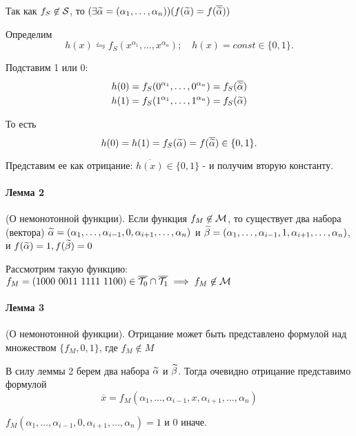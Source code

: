 \begin{myproof}
    Так как $f_S \not\in {\cal S}$, то $(\exists \widetilde{\alpha} = (\alpha_1, \ldots, \alpha_n))
    (f(\widetilde{\alpha}) = f(\overline{\widetilde{\alpha}}))$ 

    Определим
    $$
    h(x) \leftrightharpoons f_S(x^{\alpha_1}, \ldots, x^{\alpha_n});
    \quad
    h(x) = const \in \{0,1\} 
    .$$ 

    Подставим 1 или 0:
    \begin{align*}
        &h(0) = f_S(0^{\alpha_1}, \ldots, 0^{\alpha_n}) = f_S(\overline{\widetilde{\alpha}})\\
        &h(1) = f_S(1^{\alpha_1}, \ldots, 1^{\alpha_n}) = f_S(\widetilde{\alpha})
    \end{align*}

    То есть
    \[
    h(0) = h(1) = f_S(\widetilde{\alpha}) = f(\overline{\widetilde{\alpha}}) \in \{0,1\} 
    .\]

    Представим ее как отрицание: $\overline{h(x)} \in \{0,1\} $ - и получим вторую константу.
\end{myproof}


\paragraph*{Лемма 2} (О немонотонной функции).
Если функция $f_M \not\in {\cal M}$, то существует два набора (вектора)  $\widetilde{\alpha} = (\alpha_1, \ldots,
\alpha_{i-1}, 0, \alpha_{i+1}, \ldots, \alpha_n)$ и $\widetilde{\beta} = (\alpha_1, \ldots,
\alpha_{i-1}, 1, \alpha_{i+1}, \ldots, \alpha_n)$, и $f(\widetilde{\alpha}) = 1, f(\widetilde{\beta}) = 0$

\medskip

Рассмотрим такую функцию: $f_M =
                            (1000\text{ }0011\text{ }1111\text{ }1100) \in 
                            \overline{{\cal T}_0} \cap \overline{{\cal T}_1} \implies f_M \not\in 
                            {\cal M}$


\paragraph*{Лемма 3} (О немонотонной функции).
Отрицание может быть представлено формулой над множеством $\{f_M, 0, 1\}$, где
$f_M \not\in M$

\begin{myproof}
В силу леммы 2 берем два набора $\widetilde{\alpha}$ и  $\widetilde{\beta}$. Тогда очевидно отрицание
представимо формулой
 \[
\overline{x} = f_M(\alpha_1, \ldots, \alpha_{i-1}, x, \alpha_{i+1}, \ldots, \alpha_n)
\]

$f_M(\alpha_1, \ldots, \alpha_{i-1}, 0, \alpha_{i+1}, \ldots, \alpha_n) = 1$ и 0 иначе.
\end{myproof}


